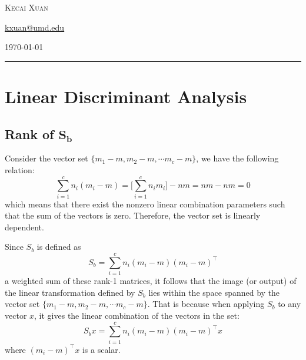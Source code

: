 \documentclass[12pt]{article}
\newcommand{\0}{\boldsymbol{0}}
\begin{document}
\begin{titlepage}
    \vspace{0.013\textheight}

    {\large \textsc{Kecai Xuan}}

    \vspace{0.013\textheight}

    {\large \href{mailto:kxuan@umd.edu}{kxuan@umd.edu}}





    \vspace{0.04\textheight}


    \vfill  %

    {\large \today}  %
    \vspace{0.04\textheight}  %


    \rule{\textwidth}{1pt}  %

\end{titlepage}

\section{Linear Discriminant Analysis}

\subsection{Rank of $\mathbf{S_b}$}

Consider the vector set $\{m_1 - m, m_2 - m,\cdots m_c-m\}$, we have the following relation:
\[
    \sum_{i=1}^c n_i\left(m_i-m\right)=\bigg[\sum_{i=1}^c n_i m_i\bigg]-n m=n m-n m=0
\]
which means that there exist the nonzero linear combination parameters such that the sum of the vectors is zero. Therefore, the vector set is linearly dependent.

Since $S_b$ is defined as
\[
    \displaystyle S_b=\sum_{i=1}^c n_i\left(m_i-m\right)\left(m_i-m\right)^\top
\]
a weighted sum of these rank-1 matrices, it follows that the image (or output) of the linear transformation defined by $S_b$ lies within the space spanned by the vector set $\{m_1 - m, m_2 - m,\cdots m_c-m\}$. That is because when applying $S_b$ to any vector $x$, it gives the linear combination of the vectors in the set:
\[
    S_b x = \sum_{i=1}^c n_i\left(m_i-m\right)\left(m_i-m\right)^\top x
\]
where $\left(m_i-m\right)^\top x$ is a scalar. 
\end{document}
